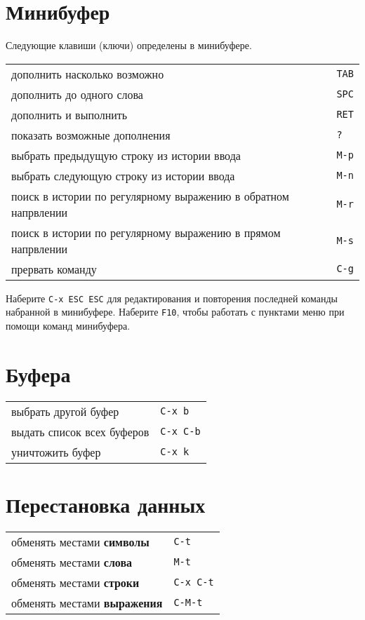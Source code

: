 \documentclass[10pt]{article}
\newlength{\ColWidth}
\newcommand{\kbd}[1]{\texttt{#1}}
\begin{document}
\section{Минибуфер}

Следующие клавиши (ключи) определены в минибуфере.

\begin{tabular}{p{\ColWidth}l}
дополнить насколько возможно & \kbd{TAB} \\
дополнить до одного слова & \kbd{SPC} \\
дополнить и выполнить & \kbd{RET} \\
показать возможные дополнения & \kbd{?} \\
выбрать предыдущую строку из истории ввода & \kbd{M-p} \\
выбрать следующую строку из истории ввода & \kbd{M-n} \\
поиск в истории по регулярному выражению в обратном напрвлении & \kbd{M-r} \\
поиск в истории по регулярному выражению в прямом напрвлении & \kbd{M-s} \\
прервать команду & \kbd{C-g} \\
\end{tabular}

Наберите \kbd{C-x ESC ESC} для редактирования и повторения последней
команды набранной в минибуфере. Наберите \kbd{F10}, чтобы работать с
пунктами меню при помощи команд минибуфера.

\section{Буфера}

\begin{tabular}{p{\ColWidth}l}
выбрать другой буфер & \kbd{C-x b} \\
выдать список всех буферов & \kbd{C-x C-b} \\
уничтожить буфер & \kbd{C-x k} \\
\end{tabular}

\section{Перестановка данных}

\begin{tabular}{p{\ColWidth}l}
обменять местами {\bf символы} & \kbd{C-t} \\
обменять местами  {\bf слова} & \kbd{M-t} \\
обменять местами  {\bf строки} & \kbd{C-x C-t} \\
обменять местами  {\bf выражения} & \kbd{C-M-t} \\
\end{tabular}
\end{document}
